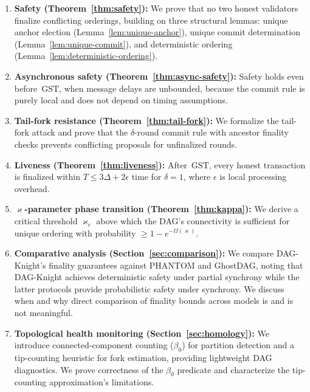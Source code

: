 \documentclass[11pt,a4paper]{article}
\theoremstyle{definition}
\theoremstyle{remark}
\newcommand{\DK}{\textsf{DAG-Knight}}
\newcommand{\GST}{\mathrm{GST}}
\renewcommand{\kappa}{\varkappa}
\begin{document}
\begin{enumerate}[leftmargin=*]
\item \textbf{Safety (Theorem~\ref{thm:safety}):}
  We prove that no two honest validators finalize conflicting orderings,
  building on three structural lemmas: unique anchor election
  (Lemma~\ref{lem:unique-anchor}), unique commit determination
  (Lemma~\ref{lem:unique-commit}), and deterministic ordering
  (Lemma~\ref{lem:deterministic-ordering}).

\item \textbf{Asynchronous safety (Theorem~\ref{thm:async-safety}):}
  Safety holds even before~$\GST$, when message delays are unbounded,
  because the commit rule is purely local and does not depend on timing
  assumptions.

\item \textbf{Tail-fork resistance (Theorem~\ref{thm:tail-fork}):}
  We formalize the tail-fork attack and prove that the $\delta$-round
  commit rule with ancestor finality checks prevents conflicting proposals
  for unfinalized rounds.

\item \textbf{Liveness (Theorem~\ref{thm:liveness}):}
  After~$\GST$, every honest transaction is finalized within
  $T \leq 3\Delta + 2\epsilon$ time for $\delta = 1$, where $\epsilon$
  is local processing overhead.

\item \textbf{$\kappa$-parameter phase transition (Theorem~\ref{thm:kappa}):}
  We derive a critical threshold $\kappa_c$ above which the DAG's
  connectivity is sufficient for unique ordering with probability
  $\geq 1 - e^{-\Omega(\kappa)}$.

\item \textbf{Comparative analysis (Section~\ref{sec:comparison}):}
  We compare \DK{}'s finality guarantees against PHANTOM and GhostDAG,
  noting that \DK{} achieves deterministic safety under partial synchrony
  while the latter protocols provide probabilistic safety under synchrony.
  We discuss when and why direct comparison of finality bounds across
  models is and is not meaningful.

\item \textbf{Topological health monitoring (Section~\ref{sec:homology}):}
  We introduce connected-component counting ($\beta_0$) for partition
  detection and a tip-counting heuristic for fork estimation, providing
  lightweight DAG diagnostics.
  We prove correctness of the $\beta_0$ predicate and characterize the
  tip-counting approximation's limitations.
\end{enumerate}
\end{document}
